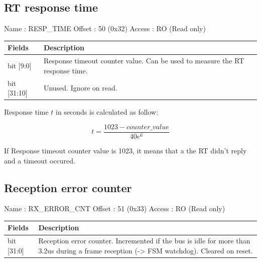 \documentclass[11pt,a4paper]{article}
\begin{document}
\subsection{RT response time}

Name   : RESP\_TIME \newline
Offset : 50 (0x32) \newline
Access : RO (Read only) \newline

\begin{table}[h!]
  \begin{tabularx}{\textwidth}{ l X }
    \hline
    \textbf{Fields} & \textbf{Description}\\
    \hline
    bit [9:0]   & Response timeout counter value. Can be used to measure the RT response time. \\
    bit [31:10] & Unused. Ignore on read. \\
    \hline
  \end{tabularx}
\end{table}

Response time $t$ in seconds is calculated as follow:

\[
t = \frac{1023 - counter\_value}{40e^6}
\]

If Response timeout counter value is 1023, it means that a the RT didn't reply and a timeout occured.

\subsection{Reception error counter}

Name   : RX\_ERROR\_CNT \newline
Offset : 51 (0x33) \newline
Access : RO (Read only) \newline

\begin{table}[h!]
  \begin{tabularx}{\textwidth}{ l X }
    \hline
    \textbf{Fields} & \textbf{Description}\\
    \hline
    bit [31:0]  & Reception error counter. Incremented if the bus is idle for more than 3.2us during a frame reception (-> FSM watchdog). Cleared on reset. \\
    \hline
  \end{tabularx}
\end{table}
\end{document}
